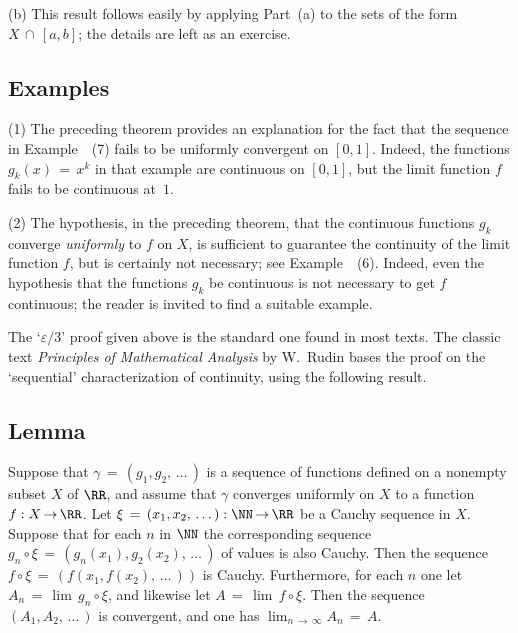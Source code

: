 \V

        (b) This result follows easily by applying Part~(a) to the sets of the form $X\,{\cap}\,[a,b]$; the details are left as an exercise.

\V
\V

            \subsection{\small{\bf Examples}}
            \label{ExampF05.50}

\V

    
\hspace*{\parindent}(1) The preceding theorem provides an explanation for the fact that the sequence in Example~~(7) fails to be uniformly convergent on $[0,1]$.
    Indeed, the functions $g_{k}(x) \,=\, x^{k}$ in that example are continuous on $[0,1]$, but the limit function $f$ fails to be continuous at~$1$.

\V

        (2) The hypothesis, in the preceding theorem, that the continuous functions $g_{k}$ converge {\em uniformly} to $f$ on $X$,
    is sufficient to guarantee the continuity of the limit function $f$,
    but is certainly not necessary; see Example~~(6).
    Indeed, even the hypothesis that the functions $g_{k}$ be continuous is not necessary to get $f$ continuous;
    the reader is invited to find a suitable example.

\V
\V

        The `${\varepsilon}/3$' proof given above is the standard one found in most texts.
    The classic text {\em Principles of Mathematical Analysis} by W.~Rudin bases the proof on the `sequential' characterization of continuity, using the following result.


\V

            \subsection{\small{\bf Lemma}}
            \label{LemmaF05.55}

        Suppose that ${\gamma} \,=\, (g_{1},g_{2},\,{\ldots}\,)$ is a sequence of functions defined on a nonempty subset $X$ of ${\RR}$,
    and assume that ${\gamma}$ converges uniformly on $X$ to a function~$f:X \,{\rightarrow}\, {\RR}$.
    Let ${\xi} \,=\, (x_{1},x_{2},\,{\ldots}\,):{\NN} \,{\rightarrow}\, {\RR}$ be a Cauchy sequence in $X$.
    Suppose that for each $n$ in ${\NN}$ the corresponding sequence $g_{n}{\circ}{\xi} \,=\, (g_{n}(x_{1}), g_{2}(x_{2}),\,{\ldots}\,)$ of values is also Cauchy.
    Then the sequence $f{\circ}{\xi} \,=\, (f(x_{1},f(x_{2}),\,{\ldots}\,))$ is Cauchy.
    Furthermore, for each $n$ one let $A_{n} \,=\, \lim\,g_{n}{\circ}{\xi}$, and likewise let $A \,=\, \lim\,f{\circ}{\xi}$.
    Then the sequence $(A_{1},A_{2},\,{\ldots}\,)$ is convergent, and one has $\lim_{n \,{\rightarrow}\, {\infty}} A_{n} \,=\, A$.

